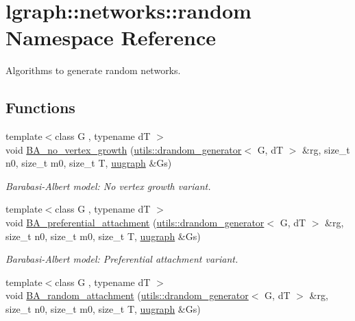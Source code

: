 \hypertarget{namespacelgraph_1_1networks_1_1random}{}\section{lgraph\+:\+:networks\+:\+:random Namespace Reference}
\label{namespacelgraph_1_1networks_1_1random}


Algorithms to generate random networks.  


\subsection*{Functions}
\begin{DoxyCompactItemize}
\item 
{\footnotesize template$<$class G , typename dT $>$ }\\void \hyperlink{namespacelgraph_1_1networks_1_1random_ab7e205d59b9526aa28812c93059ec327}{B\+A\+\_\+no\+\_\+vertex\+\_\+growth} (\hyperlink{classlgraph_1_1utils_1_1drandom__generator}{utils\+::drandom\+\_\+generator}$<$ G, dT $>$ \&rg, size\+\_\+t n0, size\+\_\+t m0, size\+\_\+t T, \hyperlink{classlgraph_1_1uugraph}{uugraph} \&Gs)
\begin{DoxyCompactList}\small\item\em Barabasi-\/\+Albert model\+: No vertex growth variant. \end{DoxyCompactList}\item 
{\footnotesize template$<$class G , typename dT $>$ }\\void \hyperlink{namespacelgraph_1_1networks_1_1random_adbb7aa72c5ebdd0dc0227e0e403b6707}{B\+A\+\_\+preferential\+\_\+attachment} (\hyperlink{classlgraph_1_1utils_1_1drandom__generator}{utils\+::drandom\+\_\+generator}$<$ G, dT $>$ \&rg, size\+\_\+t n0, size\+\_\+t m0, size\+\_\+t T, \hyperlink{classlgraph_1_1uugraph}{uugraph} \&Gs)
\begin{DoxyCompactList}\small\item\em Barabasi-\/\+Albert model\+: Preferential attachment variant. \end{DoxyCompactList}\item 
{\footnotesize template$<$class G , typename dT $>$ }\\void \hyperlink{namespacelgraph_1_1networks_1_1random_ae23132af2a101beecd12bededcc8cdeb}{B\+A\+\_\+random\+\_\+attachment} (\hyperlink{classlgraph_1_1utils_1_1drandom__generator}{utils\+::drandom\+\_\+generator}$<$ G, dT $>$ \&rg, size\+\_\+t n0, size\+\_\+t m0, size\+\_\+t T, \hyperlink{classlgraph_1_1uugraph}{uugraph} \&Gs)

\end{DoxyCompactItemize}
